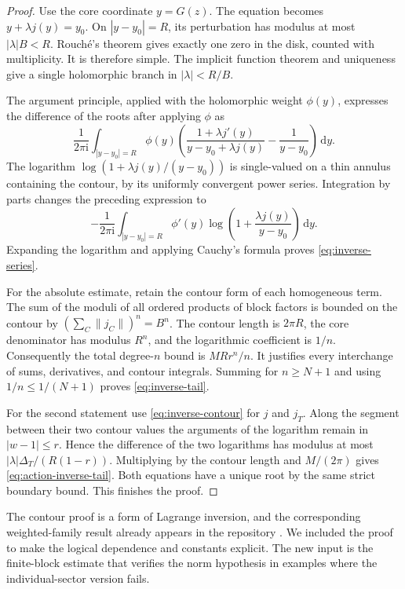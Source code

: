\documentclass[11pt,a4paper]{article}
\numberwithin{equation}{section}
\theoremstyle{definition}
\theoremstyle{remark}
\newcommand{\ii}{\mathrm i}
\newcommand{\dd}{\,\mathrm d}
\begin{document}
\begin{proof}
Use the core coordinate $y=G(z)$. The equation becomes
$y+\lambda j(y)=y_0$. On $|y-y_0|=R$, its perturbation has modulus at
most $|\lambda|B<R$. Rouch\'e's theorem gives exactly one zero in the
disk, counted with multiplicity. It is therefore simple. The implicit
function theorem and uniqueness give a single holomorphic branch in
$|\lambda|<R/B$.

The argument principle, applied with the holomorphic weight $\phi(y)$,
expresses the difference of the roots after applying $\phi$ as
\[
 \frac1{2\pi\ii}\int_{|y-y_0|=R}\phi(y)
 \left(\frac{1+\lambda j'(y)}{y-y_0+\lambda j(y)}
              -\frac1{y-y_0}\right)\dd y.
\]
The logarithm $\log(1+\lambda j(y)/(y-y_0))$ is single-valued on a thin
annulus containing the contour, by its uniformly convergent power series.
Integration by parts changes the preceding expression to
\begin{equation}
 -\frac1{2\pi\ii}\int_{|y-y_0|=R}
        \phi'(y)\log\left(1+\frac{\lambda j(y)}{y-y_0}\right)\dd y.
 \label{eq:inverse-contour}
\end{equation}
Expanding the logarithm and applying Cauchy's formula proves
\eqref{eq:inverse-series}.

For the absolute estimate, retain the contour form of each homogeneous
term. The sum of the moduli of all ordered products of block factors is
bounded on the contour by
$(\sum_C\|j_C\|)^n=B^n$. The contour length is $2\pi R$, the core
denominator has modulus $R^n$, and the logarithmic coefficient is $1/n$.
Consequently the total degree-$n$ bound is $MRr^n/n$. It justifies every
interchange of sums, derivatives, and contour integrals. Summing for
$n\ge N+1$ and using $1/n\le1/(N+1)$ proves
\eqref{eq:inverse-tail}.

For the second statement use \eqref{eq:inverse-contour} for $j$ and
$j_T$. Along the segment between their two contour values the arguments
of the logarithm remain in $|w-1|\le r$. Hence the difference of the two
logarithms has modulus at most
$|\lambda|\Delta_T/(R(1-r))$. Multiplying by the contour length and
$M/(2\pi)$ gives \eqref{eq:action-inverse-tail}. Both equations have a
unique root by the same strict boundary bound. This finishes the proof.
\end{proof}

The contour proof is a form of Lagrange inversion, and the corresponding
weighted-family result already appears in the repository
\cite{repo-stokes}. We included the proof to make the logical dependence
and constants explicit. The new input is the finite-block estimate that
verifies the norm hypothesis in examples where the individual-sector
version fails.
\end{document}
